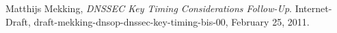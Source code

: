 \documentclass[twoside, a4paper]{article}
\begin{document}

\begin{thebibliography}{9}

  Matthijs Mekking,
  \emph{DNSSEC Key Timing Considerations Follow-Up}.
  Internet-Draft,
  draft-mekking-dnsop-dnssec-key-timing-bis-00,
  February 25, 2011.

\end{thebibliography}
\end{document}
